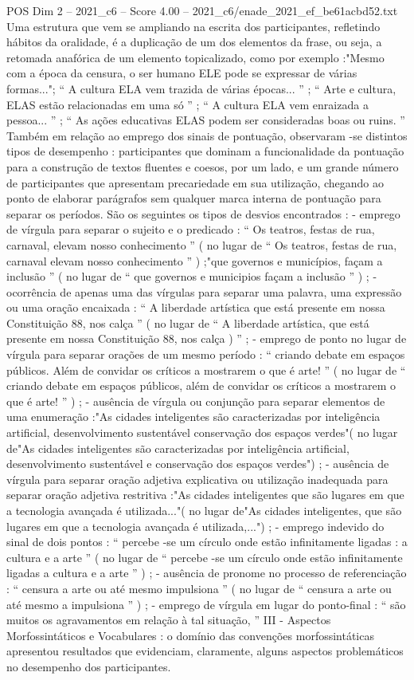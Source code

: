 \begin{textsample}{POS Dim 2 – 2021\_c6 – Score 4.00 – 2021\_c6/enade\_2021\_ef\_be61acbd52.txt}
Uma estrutura que vem se ampliando na escrita dos participantes, refletindo hábitos da oralidade, é a duplicação de um dos elementos da frase, ou seja, a retomada anafórica de um elemento topicalizado, como por exemplo :"Mesmo com a época da censura, o ser humano ELE pode se expressar de várias formas..."; “ A cultura ELA vem trazida de várias épocas... ” ; “ Arte e cultura, ELAS estão relacionadas em uma só ” ; “ A cultura ELA vem enraizada a pessoa... ” ; “ As ações educativas ELAS podem ser consideradas boas ou ruins. ” Também em relação ao emprego dos sinais de pontuação, observaram -se distintos tipos de desempenho : participantes que dominam a funcionalidade da pontuação para a construção de textos fluentes e coesos, por um lado, e um grande número de participantes que apresentam precariedade em sua utilização, chegando ao ponto de elaborar parágrafos sem qualquer marca interna de pontuação para separar os períodos.
São os seguintes os tipos de desvios encontrados : - emprego de vírgula para separar o sujeito e o predicado : “ Os teatros, festas de rua, carnaval, elevam nosso conhecimento ” ( no lugar de “ Os teatros, festas de rua, carnaval elevam nosso conhecimento ” ) ;"que governos e municípios, façam a inclusão ” ( no lugar de “ que governos e municipios façam a inclusão ” ) ; - ocorrência de apenas uma das vírgulas para separar uma palavra, uma expressão ou uma oração encaixada : “ A liberdade artística que está presente em nossa Constituição 88, nos calça ” ( no lugar de “ A liberdade artística, que está presente em nossa Constituição 88, nos calça ) ” ; - emprego de ponto no lugar de vírgula para separar orações de um mesmo período : “ criando debate em espaços públicos.
Além de convidar os críticos a mostrarem o que é arte! ” ( no lugar de “ criando debate em espaços públicos, além de convidar os críticos a mostrarem o que é arte! ” ) ; - ausência de vírgula ou conjunção para separar elementos de uma enumeração :"As cidades inteligentes são caracterizadas por inteligência artificial, desenvolvimento sustentável conservação dos espaços verdes"( no lugar de"As cidades inteligentes são caracterizadas por inteligência artificial, desenvolvimento sustentável e conservação dos espaços verdes") ; - ausência de vírgula para separar oração adjetiva explicativa ou utilização inadequada para separar oração adjetiva restritiva :"As cidades inteligentes que são lugares em que a tecnologia avançada é utilizada..."( no lugar de"As cidades inteligentes, que são lugares em que a tecnologia avançada é utilizada,...") ; - emprego indevido do sinal de dois pontos : “ percebe -se um círculo onde estão infinitamente ligadas : a cultura e a arte ” ( no lugar de “ percebe -se um círculo onde estão infinitamente ligadas a cultura e a arte ” ) ; - ausência de pronome no processo de referenciação : “ censura a arte ou até mesmo impulsiona ” ( no lugar de “ censura a arte ou até mesmo a impulsiona ” ) ; - emprego de vírgula em lugar do ponto-final : “ são muitos os agravamentos em relação à tal situação, ” III - Aspectos Morfossintáticos e Vocabulares : o domínio das convenções morfossintáticas apresentou resultados que evidenciam, claramente, alguns aspectos problemáticos no desempenho dos participantes.

\end{textsample}
